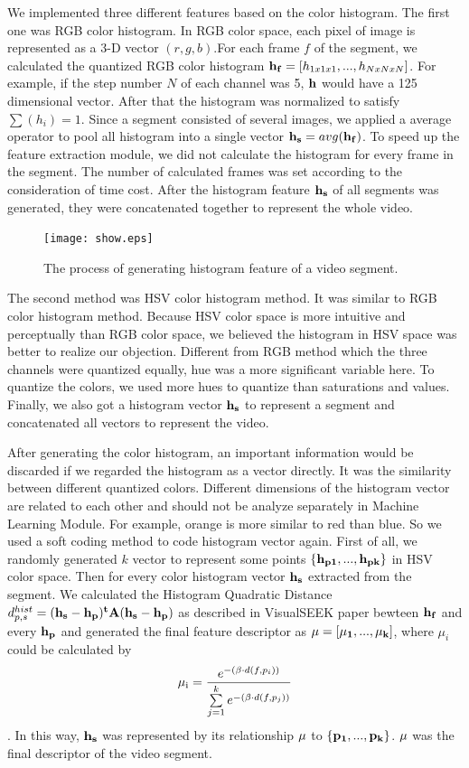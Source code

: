 \documentclass{report}
\begin{document}
We implemented three different features based on the color histogram. The first one was RGB color histogram. In RGB color space, each pixel of image is represented as a 3-D vector $(r, g, b)$.For each frame $f$ of the segment, we calculated the quantized RGB color histogram ${\bf{h}_f} = [{h_{1x1x1}},...,{h_{NxNxN}}]$. For example, if the step number $N$ of each channel was 5, ${\bf{h}}$ would have a 125 dimensional vector. After that the histogram was normalized to satisfy $\sum({h_i}) = 1$.  Since a segment consisted of several images, we applied a average operator to pool all histogram into a single vector ${\bf{h}_s} = avg(\bf{h}_f)$. To speed up the feature extraction module, we did not calculate the histogram for every frame in the segment. The number of calculated frames was set according to the consideration of time cost. After the histogram feature ${\bf{h}_s}$ of all segments was generated, they were concatenated together to represent the whole video.

\begin{figure}[htb]
\centering
\texttt{[image: show.eps]}
\caption{The process of generating histogram feature of a video segment.}
\end{figure}

The second method was HSV color histogram method. It was similar to RGB color histogram method. Because HSV color space is more intuitive and perceptually than RGB color space, we believed the histogram in HSV space was better to realize our objection. Different from RGB method which the three channels were quantized equally, hue was a more significant variable here. To quantize the colors, we used more hues to quantize than saturations and values. Finally, we also got a histogram vector ${\bf{h}_s}$ to represent a segment and concatenated all vectors to represent the video.

After generating the color histogram, an important information would be discarded if we regarded the histogram as a vector directly. It was the similarity between different quantized colors. Different dimensions of the histogram vector are related to each other and should not be analyze separately in Machine Learning Module. For example, orange is more similar to red than blue. So we used a soft coding method to code histogram vector again. First of all, we randomly generated $k$ vector to represent some points $\{\bf{h}_{p1},...,\bf{h}_{pk}\}$ in HSV color space. Then for every color histogram vector ${\bf{h}_s}$ extracted from the segment. We calculated the Histogram Quadratic Distance $d^{hist}_{p,s} = (\bf{h}_s - \bf{h}_p)^t\bf{A}(\bf{h}_s - \bf{h}_p)$ as described in VisualSEEK paper bewteen ${\bf{h}_f}$ and every $\bf{h}_p$ and generated the final feature descriptor as $\bf{\mu}=[\mu_1,...,\mu_k]$, where $\mu_i$ could be calculated by
\[{\mu _{\rm{i}}} = \frac{{{e^{ - \left( {\beta  \cdot d(f,{p_i})} \right)}}}}{{\sum\limits_{j = 1}^k {{e^{ - \left( {\beta  \cdot d(f,{p_j})} \right)}}} }}\].
In this way, ${\bf{h}_s}$ was represented by its relationship $\bf{\mu}$ to $\{\bf{p}_1,...,\bf{p}_k\}$. $\bf{\mu}$ was the final descriptor of the video segment.
\end{document}
